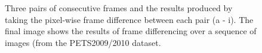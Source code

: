 \documentclass[twocolumn, final]{svjour3}
\begin{document}
\begin{figure}
  \\
   \hspace{0.1mm}
   \hspace{0.1mm}
  \\
  \caption{Three pairs of consecutive frames and the results produced by taking the pixel-wise frame difference between each pair (a - i). The final image shows the results of frame differencing over a sequence of images (from the PETS2009/2010 dataset.}
  \label{fig:img_and_framediff}
\end{figure}
\end{document}
